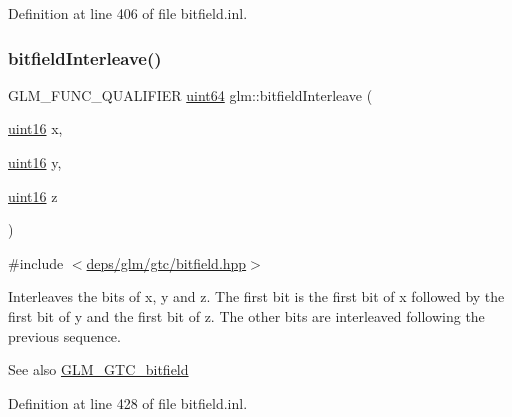 Definition at line 406 of file bitfield.\+inl.

\mbox{\label{group__gtc__bitfield_ga3c170e2ec54f2faab5e1c5bb693d718d}} 
\subsubsection{\texorpdfstring{bitfield\+Interleave()}{bitfieldInterleave()}\hspace{0.1cm}{\footnotesize\ttfamily [10/16]}}
{\footnotesize\ttfamily G\+L\+M\+\_\+\+F\+U\+N\+C\+\_\+\+Q\+U\+A\+L\+I\+F\+I\+ER \hyperlink{group__gtc__type__precision_gae3632bf9b37da66233d78930dd06378a}{uint64} glm\+::bitfield\+Interleave (\begin{DoxyParamCaption}\item[{\hyperlink{group__gtc__type__precision_gad8c2939e1fdd8e5828b31d95c52255d5}{uint16}}]{x,  }\item[{\hyperlink{group__gtc__type__precision_gad8c2939e1fdd8e5828b31d95c52255d5}{uint16}}]{y,  }\item[{\hyperlink{group__gtc__type__precision_gad8c2939e1fdd8e5828b31d95c52255d5}{uint16}}]{z }\end{DoxyParamCaption})}



{\ttfamily \#include $<$\hyperlink{bitfield_8hpp}{deps/glm/gtc/bitfield.\+hpp}$>$}

Interleaves the bits of x, y and z. The first bit is the first bit of x followed by the first bit of y and the first bit of z. The other bits are interleaved following the previous sequence.

\begin{DoxySeeAlso}{See also}
\hyperlink{group__gtc__bitfield}{G\+L\+M\+\_\+\+G\+T\+C\+\_\+bitfield} 
\end{DoxySeeAlso}


Definition at line 428 of file bitfield.\+inl.

\mbox{\label{group__gtc__bitfield_ga64e2d84f6560af3cc639644b1e628c42}} 
